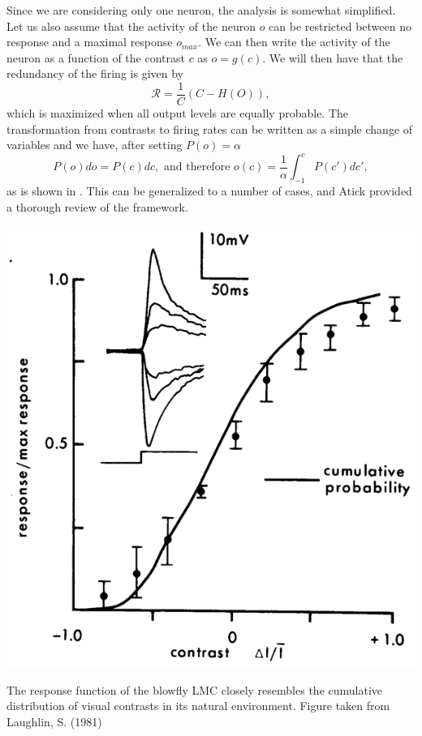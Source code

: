 Since we are considering only one neuron, the analysis is somewhat simplified. Let us also assume that the activity of the neuron $o$ can be restricted between no response and a maximal response $o_{max}$. We can then write the activity of the neuron as a function of the contrast $c$ as $o = g(c)$. We will then have that the redundancy of the firing is given by
$$
\mathcal{R} = \frac{1}{C} \left(C - H(O) \right),
$$
which is maximized when all output levels are equally probable.
The transformation from contrasts to firing rates can be written as a simple change of variables and we have, after setting $P(o) = \alpha$
$$
P(o) do = P(c) dc, \textrm{ and therefore } o(c) = \frac{1}{\alpha} \int_{-1}^c P(c') dc',
$$
as is shown in . This can be generalized to a number of cases, and Atick\cite{Atick1992} provided a thorough review of the framework.\par

\begin{marginfigure}
\includegraphics[width=\columnwidth]{figures/laughlin_81.eps}
\label{fig:laughlin}
\caption{The response function of the blowfly LMC closely resembles the cumulative distribution of visual contrasts in its natural environment. Figure taken from Laughlin, S. (1981)}
\end{marginfigure}

